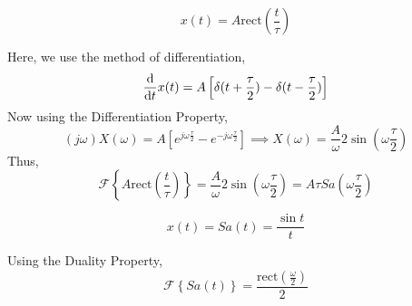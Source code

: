		\begin{eg}
			\[x(t)=A\text{rect}\left(\frac{t}{\tau}\right)\]
		\end{eg}
		\begin{explanation}
			Here, we use the method of differentiation,
			\[\dv{t}x(t)=A\left[\delta(t+\frac{\tau}{2}) - \delta(t-\frac{\tau}{2})\right]\]
			Now using the Differentiation Property,
			\[(j\omega)X(\omega)=A\left[e^{j\omega\frac{\tau}{2}}-e^{-j\omega\frac{\tau}{2}} \right] \implies X(\omega)=\frac{A}{\omega}2\sin(\omega\frac{\tau}{2})\]
			Thus,
			\[\mathcal{F}\left\{ A\text{rect}\left(\frac{t}{\tau}\right) \right\}=\frac{A}{\omega}2\sin(\omega\frac{\tau}{2})=A\tau Sa\left(\omega\frac{\tau}{2}\right)\]
		\end{explanation}
		\begin{eg}
			\[x(t)=Sa(t)=\frac{\sin t}{t}\]
		\end{eg}
		\begin{explanation}
			Using the Duality Property,
			\[\mathcal{F}\left\{Sa(t)\right\}=\frac{\text{rect}\left(\frac{\omega}{2}\right)}{2}\]
		\end{explanation}
